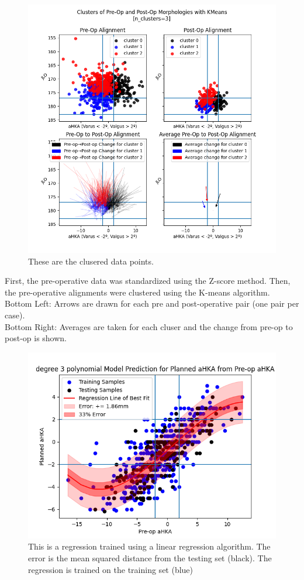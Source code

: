 \documentclass{article}
\begin{document}
\begin{figure}[t]
\includegraphics[width=\textwidth]{clusters.png}
\caption{These are the clusered data points.}
\end{figure}

First, the pre-operative data was standardized using the Z-score method.
Then, the pre-operative alignments were clustered using the K-means algorithm.\\
Bottom Left: Arrows are drawn for each pre and post-operative pair (one pair per case).\\
Bottom Right: Averages are taken for each cluser and the change from pre-op to post-op is shown.

\newpage

\begin{figure}[t]
	\includegraphics[width=\textwidth]{degree_3_polynomial_regression.png}
	\caption{This is a regression trained using a linear regression algorithm.
	The error is the mean squared distance from the testing set (black). 
	The regression is trained on the training set (blue)}
\end{figure}
\end{document}
